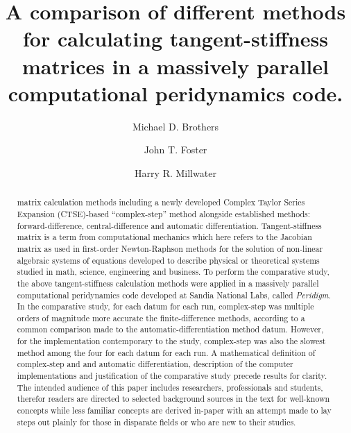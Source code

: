 \documentclass[preprint,12pt]{elsarticle}
\begin{document}
\begin{frontmatter}


\author{Michael D. Brothers}
\author{John T. Foster}
\author{Harry R. Millwater}
\address{Mechanical Engineering Department, The University of Texas at San Antonio}


\title{A comparison of different methods for calculating tangent-stiffness matrices in a massively parallel computational peridynamics code.}


\begin{abstract} %
matrix calculation methods including a newly developed Complex Taylor Series Expansion
(CTSE)-based ``complex-step'' method alongside established methods: forward-difference,
central-difference and automatic differentiation.  Tangent-stiffness matrix is a term from
computational mechanics which here refers to the Jacobian matrix as used in first-order
Newton-Raphson methods for the solution of non-linear algebraic systems of equations developed
to describe physical or theoretical systems studied in math, science, engineering and business.
To perform the comparative study, the above tangent-stiffness calculation methods were applied
in a massively parallel computational peridynamics code developed at Sandia National Labs,
called \emph{Peridigm}. In the comparative study, for each datum for each run, complex-step was
multiple orders of magnitude more accurate the finite-difference methods, according to a common
comparison made to the automatic-differentiation method datum. However, for the implementation
contemporary to the study, complex-step was also the slowest method among the four for each
datum for each run. A mathematical definition of complex-step and
and automatic differentiation, description of the computer implementations and justification
of the comparative study precede results for clarity. The intended audience of this paper
includes researchers, professionals and students, therefor readers are directed to
selected background sources in the text for well-known concepts while less familiar concepts
are derived in-paper with an attempt made to lay steps out plainly for those in disparate fields
or who are new to their studies.  \end{abstract}


\end{frontmatter}
\end{document}
